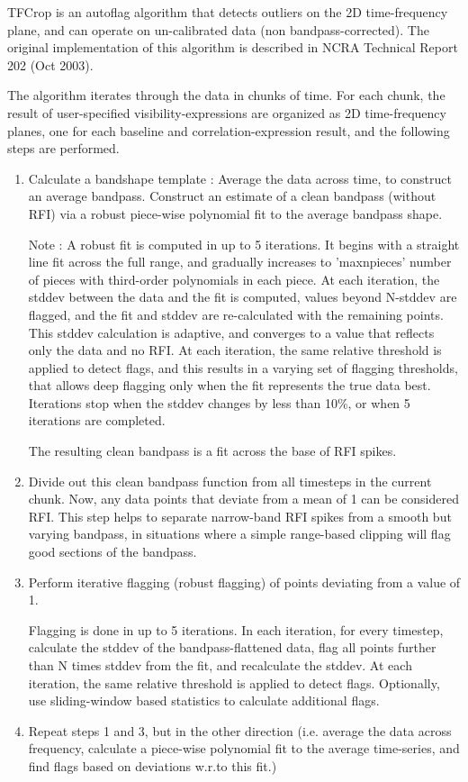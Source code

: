 TFCrop is an autoflag algorithm that detects outliers on the 2D
time-frequency plane, and can operate on un-calibrated data (non
bandpass-corrected). The original implementation of this algorithm is
described in NCRA Technical Report 202 (Oct 2003).

The algorithm iterates through the data in chunks of time. For each
chunk, the result of user-specified visibility-expressions are
organized as 2D time-frequency planes, one for each baseline and
correlation-expression result, and the following steps are performed.

\begin{enumerate}
\item Calculate a bandshape template : Average the data across time, to
construct an average bandpass. Construct an estimate of a clean
bandpass (without RFI) via a robust piece-wise polynomial fit to the
average bandpass shape.

Note : A robust fit is computed in up to 5 iterations. It begins with a
straight line fit across the full range, and gradually increases to
'maxnpieces' number of pieces with third-order polynomials in each
piece. At each iteration, the stddev between the data and the fit is
computed, values beyond N-stddev are flagged, and the fit and stddev
are re-calculated with the remaining points. This stddev calculation
is adaptive, and converges to a value that reflects only the data and
no RFI. At each iteration, the same relative threshold is applied to
detect flags, and this results in a varying set of flagging
thresholds, that allows deep flagging only when the fit represents the
true data best. Iterations stop when the stddev changes by less than
10\%, or when 5 iterations are completed.

The resulting clean bandpass is a fit across the base of RFI spikes.

\item Divide out this clean bandpass function from all timesteps in the
current chunk. Now, any data points that deviate from a mean of 1 can
be considered RFI. This step helps to separate narrow-band RFI spikes
from a smooth but varying bandpass, in situations where a simple
range-based clipping will flag good sections of the bandpass.

\item Perform iterative flagging (robust flagging) of points deviating from
a value of 1.

Flagging is done in up to 5 iterations. In each iteration, for every
timestep, calculate the stddev of the bandpass-flattened data, flag
all points further than N times stddev from the fit, and recalculate
the stddev. At each iteration, the same relative threshold is applied
to detect flags. Optionally, use sliding-window based statistics to
calculate additional flags.

\item Repeat steps 1 and 3, but in the other direction (i.e. average the
data across frequency, calculate a piece-wise polynomial fit to the
average time-series, and find flags based on deviations w.r.to this
fit.)

\end{enumerate}

